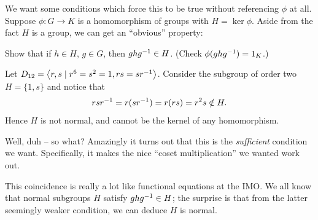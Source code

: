 We want some conditions which force this to be true without referencing $\phi$ at all.
Suppose $\phi \colon G \to K$ is a homomorphism of groups with $H = \ker\phi$.
Aside from the fact $H$ is a group, we can get an ``obvious'' property:
\begin{ques}
	Show that if $h \in H$, $g \in G$,
	then $ghg^{-1} \in H$.
	(Check $\phi(ghg^{-1}) = 1_K$.)
\end{ques}
\begin{example}
	\label{ex:dihedral_normal_subgroup}
	Let $D_{12} = \left<r,s \mid r^6=s^2=1, rs=sr^{-1}\right>$.
	Consider the subgroup of order two $H = \{1,s\}$
	and notice that \[ rsr^{-1} = r(sr^{-1})= r(rs) = r^2s \notin H. \]
	Hence $H$ is not normal, and cannot be the kernel of any homomorphism.
\end{example}
Well, duh -- so what?
Amazingly it turns out that this is the \emph{sufficient} condition we want.
Specifically, it makes the nice ``coset multiplication'' we wanted work out.
\begin{remark}
	This coincidence is really a lot like functional equations at the IMO.
	We all know that normal subgroups $H$ satisfy $ghg^{-1} \in H$;
	the surprise is that from the latter seemingly weaker condition,
	we can deduce $H$ is normal.
\end{remark}

